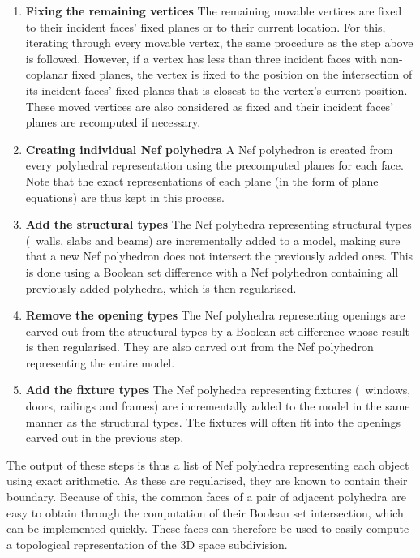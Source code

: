 \begin{enumerate}
\item
\textbf{Fixing the remaining vertices}
The remaining movable vertices are fixed to their incident faces' fixed planes or to their current location.
For this, iterating through every movable vertex, the same procedure as the step above is followed.
However, if a vertex has less than three incident faces with non-coplanar fixed planes, the vertex is fixed to the position on the intersection of its incident faces' fixed planes that is closest to the vertex's current position.
These moved vertices are also considered as fixed and their incident faces' planes are recomputed if necessary.

\item
\textbf{Creating individual Nef polyhedra}
A Nef polyhedron is created from every polyhedral representation using the precomputed planes for each face.
Note that the exact representations of each plane (in the form of plane equations) are thus kept in this process.

\item
\textbf{Add the structural types}
The Nef polyhedra representing structural types (\eg\ walls, slabs and beams) are incrementally added to a model, making sure that a new Nef polyhedron does not intersect the previously added ones.
This is done using a Boolean set difference with a Nef polyhedron containing all previously added polyhedra, which is then regularised.

\item
\textbf{Remove the opening types}
The Nef polyhedra representing openings are carved out from the structural types by a Boolean set difference whose result is then regularised.
They are also carved out from the Nef polyhedron representing the entire model.

\item
\textbf{Add the fixture types}
The Nef polyhedra representing fixtures (\eg\ windows, doors, railings and frames) are incrementally added to the model in the same manner as the structural types.
The fixtures will often fit into the openings carved out in the previous step.

\end{enumerate}

The output of these steps is thus a list of Nef polyhedra representing each object using exact arithmetic.
As these are regularised, they are known to contain their boundary.
Because of this, the common faces of a pair of adjacent polyhedra are easy to obtain through the computation of their Boolean set intersection, which can be implemented quickly.
These faces can therefore be used to easily compute a topological representation of the 3D space subdivision.

